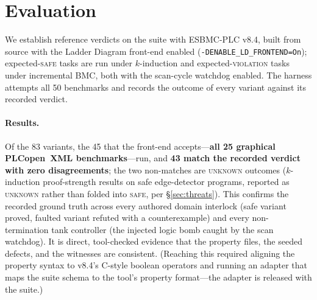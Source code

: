 \section{Evaluation}
\label{sec:eval}

We establish reference verdicts on the suite with ESBMC-PLC v8.4, built from source with the
Ladder Diagram front-end enabled (\texttt{-DENABLE\_LD\_FRONTEND=On}); expected-\textsc{safe}
tasks are run under $k$-induction and expected-\textsc{violation} tasks under incremental BMC,
both with the scan-cycle watchdog enabled. The harness attempts all 50 benchmarks and records
the outcome of every variant against its recorded verdict.

\paragraph{Results.}
Of the 83 variants, the 45 that the front-end accepts---\textbf{all 25 graphical PLCopen~XML
benchmarks}---run, and \textbf{43 match the recorded verdict with zero disagreements}; the two
non-matches are \textsc{unknown} outcomes ($k$-induction proof-strength results on safe
edge-detector programs, reported as \textsc{unknown} rather than folded into \textsc{safe}, per
\S\ref{sec:threats}). This confirms the recorded ground truth across every authored domain
interlock (safe variant proved, faulted variant refuted with a counterexample) and every
non-termination tank controller (the injected logic bomb caught by the scan watchdog). It is
direct, tool-checked evidence that the property files, the seeded defects, and the witnesses are
consistent. (Reaching this required aligning the property syntax to v8.4's C-style boolean
operators and running an adapter that maps the suite schema to the tool's property format---the
adapter is released with the suite.)

